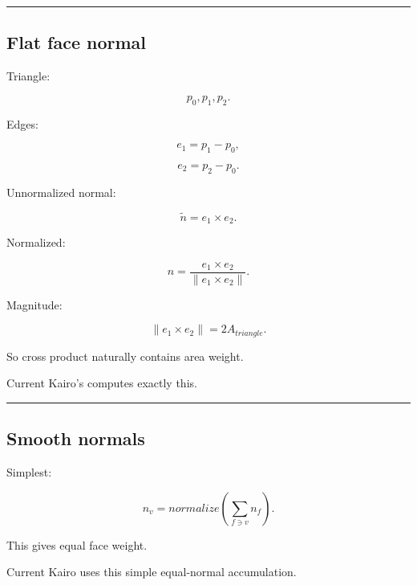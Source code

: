 \hypertarget{04-visual-computing-ii-ch041-normals-tangents-bounds-and-obj}{}

\begin{center}\rule{0.5\linewidth}{0.5pt}\end{center}

\subsection{Flat face normal}\label{04-visual-computing-ii-ch041-flat-face-normal}

\hypertarget{04-visual-computing-ii-ch041-flat-face-normal}{}

Triangle:

\[
p_0,p_1,p_2.
\]

Edges:

\[
e_1=p_1-p_0,
\]

\[
e_2=p_2-p_0.
\]

Unnormalized normal:

\[
\tilde n=
e_1\times e_2.
\]

Normalized:

\[
\boxed{
n=
\frac{
e_1\times e_2
}{
\|e_1\times e_2\|
}.
}
\]

Magnitude:

\[
\|e_1\times e_2\|
=
2A_{triangle}.
\]

So cross product naturally contains area weight.

Current Kairo's  computes exactly this.

\begin{center}\rule{0.5\linewidth}{0.5pt}\end{center}

\subsection{Smooth normals}\label{04-visual-computing-ii-ch041-smooth-normals}

\hypertarget{04-visual-computing-ii-ch041-smooth-normals}{}

Simplest:

\[
n_v=
normalize
\left(
\sum_{f\ni v}
n_f
\right).
\]

This gives equal face weight.

Current Kairo  uses this simple equal-normal accumulation.

